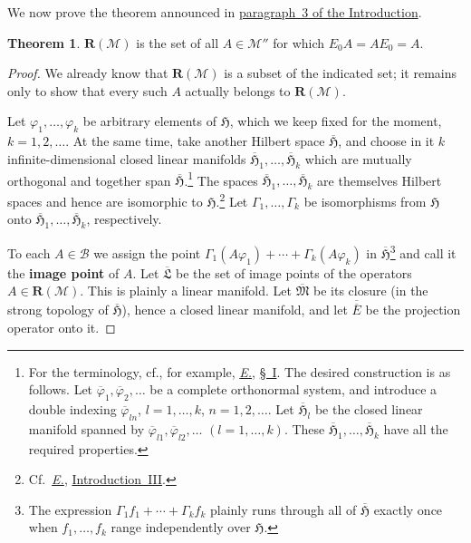 \documentclass[
  paper=b5,
  twoside=true,
  fontsize=13pt,
  headings=normal,
  bookmarkpackage=false
]{scrartcl}
\theoremstyle{definition}
\newtheorem{theorem}{Theorem}
\newcommand{\Eref}{\hyperref[fn:E-paper]{\emph{E.}}}
\newcommand{\ErefText}[1]{\href{https://doi.org/10.1007/BF01782338}{#1}}
\newcommand{\GeneratedRing}{\boldsymbol{R}}
\newcommand{\FrakM}{\mathfrak{M}}
\newcommand{\FrakL}{\mathfrak{L}}
\begin{document}
We now prove the theorem announced in
\hyperref[intro:3]{paragraph~3 of the Introduction}.

\begin{theorem}\label{thm:5}
\(\GeneratedRing (\mathcal M)\) is the set of all \(A\in\mathcal M''\) for which
\(E_0A=AE_0=A\).
\end{theorem}

\begin{proof}
We already know that \(\GeneratedRing (\mathcal M)\) is a subset of the indicated set;
it remains only to show that every such \(A\) actually belongs to
\(\GeneratedRing (\mathcal M)\).

Let \(\varphi_1,\ldots,\varphi_k\) be arbitrary elements of
\(\mathfrak H\), which we keep fixed for the moment, \(k=1,2,\ldots\).
At the same time, take another Hilbert space
\(\overline{\mathfrak H}\), and choose in it \(k\) infinite-dimensional
closed linear manifolds
\(\overline{\mathfrak H}_1,\ldots,\overline{\mathfrak H}_k\)
which are mutually orthogonal and together span
\(\overline{\mathfrak H}\).\footnote{\label{fn:48}For the terminology,
cf., for example, \Eref, \ErefText{\S~I}. The desired construction is as follows.
Let \(\overline\varphi_1,\overline\varphi_2,\ldots\) be a complete
orthonormal system, and introduce a double indexing
\(\overline\varphi_{ln}\), \(l=1,\ldots,k\), \(n=1,2,\ldots\).
Let \(\overline{\mathfrak H}_l\) be the closed linear manifold spanned by
\(\overline\varphi_{l1},\overline\varphi_{l2},\ldots\)
\((l=1,\ldots,k)\).  These
\(\overline{\mathfrak H}_1,\ldots,\overline{\mathfrak H}_k\) have all
the required properties.}
The spaces
\(\overline{\mathfrak H}_1,\ldots,\overline{\mathfrak H}_k\) are
themselves Hilbert spaces and hence are isomorphic to
\(\mathfrak H\).\footnote{\label{fn:49}Cf.\ \Eref, \ErefText{Introduction~III}.}
Let \(\Gamma_1,\ldots,\Gamma_k\) be isomorphisms from \(\mathfrak H\)
onto \(\overline{\mathfrak H}_1,\ldots,\overline{\mathfrak H}_k\), respectively.

To each \(A\in\mathcal B\) we assign the point
\(\Gamma_1(A\varphi_1)+\cdots+\Gamma_k(A\varphi_k)\) in
\(\overline{\mathfrak H}\)\footnote{\label{fn:50}The expression
\(\Gamma_1f_1+\cdots+\Gamma_kf_k\) plainly runs through all of
\(\overline{\mathfrak H}\) exactly once when \(f_1,\ldots,f_k\) range
independently over \(\mathfrak H\).} and call it the
\textbf{image point} of \(A\). Let \(\overline{\FrakL}\) be the set of
image points of the operators \(A\in \GeneratedRing (\mathcal M)\). This is plainly
a linear manifold. Let \(\overline{\FrakM}\) be its closure (in the
strong topology of \(\overline{\mathfrak H}\)), hence a closed linear
manifold, and let \(\overline{\overline E}\) be the projection operator
onto it.


\end{proof}
\end{document}

